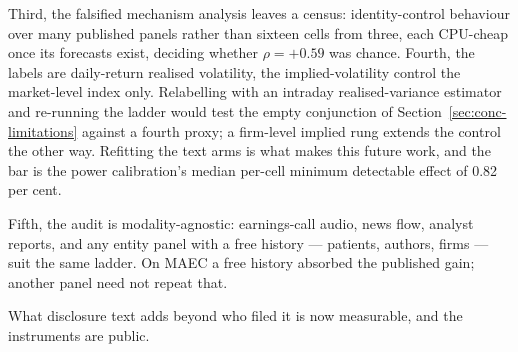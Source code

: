Third, the falsified mechanism analysis leaves a census: identity-control behaviour over many published panels rather than sixteen cells from three, each CPU-cheap once its forecasts exist, deciding whether $\rho=+0.59$ was chance. %
Fourth, the labels are daily-return realised volatility, the implied-volatility control the market-level index only. %
Relabelling with an intraday realised-variance estimator and re-running the ladder would test the empty conjunction of Section~\ref{sec:conc-limitations} against a fourth proxy; a firm-level implied rung extends the control the other way. Refitting the text arms is what makes this future work, and the bar is the power calibration's median per-cell minimum detectable effect of 0.82 per cent. %

Fifth, the audit is modality-agnostic: earnings-call audio, news flow, analyst reports, and any entity panel with a free history --- patients, authors, firms --- suit the same ladder. On MAEC a free history absorbed the published gain; another panel need not repeat that.

What disclosure text adds beyond who filed it is now measurable, and the instruments are public.
